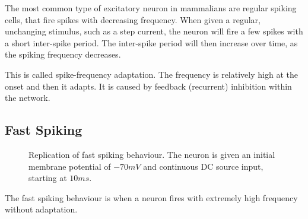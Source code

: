 \documentclass[12pt]{scrreprt}
\begin{document}
The most common type of excitatory neuron in mammalians are regular spiking cells, that fire spikes with decreasing frequency. 
When given a regular, unchanging stimulus, such as a step current, the neuron will fire a few spikes with a short inter-spike period.
The inter-spike period will then increase over time, as the spiking frequency decreases. 

This is called spike-frequency adaptation. 
The frequency is relatively high at the onset and then it adapts.
It is caused by feedback (recurrent) inhibition within the network. 

\subsection{Fast Spiking}
\label{subsec:FS}
\begin{figure}[H]
\centering
{}
\caption{Replication of fast spiking behaviour.
The neuron is given an initial membrane potential of $-70mV$ and continuous DC source input, starting at $10ms$.}
\label{fig:FS}
\end{figure} 

The fast spiking behaviour is when a neuron fires with extremely high frequency without adaptation. 
\end{document}

